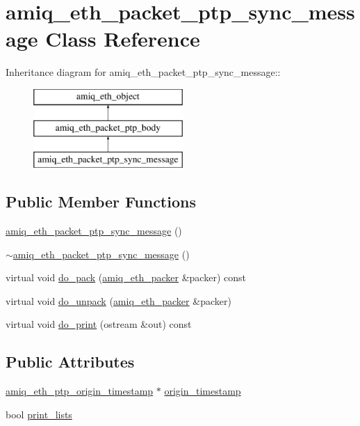 \hypertarget{classamiq__eth__packet__ptp__sync__message}{
\section{amiq\_\-eth\_\-packet\_\-ptp\_\-sync\_\-message Class Reference}
\label{classamiq__eth__packet__ptp__sync__message}
}
Inheritance diagram for amiq\_\-eth\_\-packet\_\-ptp\_\-sync\_\-message::\begin{figure}[H]
\begin{center}
\leavevmode
\includegraphics[height=3cm]{classamiq__eth__packet__ptp__sync__message}
\end{center}
\end{figure}
\subsection*{Public Member Functions}
\begin{DoxyCompactItemize}
\item 
\hyperlink{classamiq__eth__packet__ptp__sync__message_ad640a426a022d3a795d2ca5930faf864}{amiq\_\-eth\_\-packet\_\-ptp\_\-sync\_\-message} ()
\item 
\hyperlink{classamiq__eth__packet__ptp__sync__message_aa41c9c0ca4a366b0b16ead16d6777bb0}{$\sim$amiq\_\-eth\_\-packet\_\-ptp\_\-sync\_\-message} ()
\item 
virtual void \hyperlink{classamiq__eth__packet__ptp__sync__message_a5bb7abd15c0d2d2d733f042ad13c898d}{do\_\-pack} (\hyperlink{classamiq__eth__packer}{amiq\_\-eth\_\-packer} \&packer) const 
\item 
virtual void \hyperlink{classamiq__eth__packet__ptp__sync__message_ad0756fb94c7d9ea5ea0da34ca6b41a53}{do\_\-unpack} (\hyperlink{classamiq__eth__packer}{amiq\_\-eth\_\-packer} \&packer)
\item 
virtual void \hyperlink{classamiq__eth__packet__ptp__sync__message_a3eca4a1338800bcac5fdac104f350366}{do\_\-print} (ostream \&out) const 
\end{DoxyCompactItemize}
\subsection*{Public Attributes}
\begin{DoxyCompactItemize}
\item 
\hyperlink{amiq__eth__types_8cpp_add82721f4ff373d2b82269bbf5941032}{amiq\_\-eth\_\-ptp\_\-origin\_\-timestamp} $\ast$ \hyperlink{classamiq__eth__packet__ptp__sync__message_a33121ee506581632ab544ead48cbe342}{origin\_\-timestamp}
\item 
bool \hyperlink{classamiq__eth__packet__ptp__sync__message_ae7f8f44c6b98c23c6f826bbc29e7598c}{print\_\-lists}
\end{DoxyCompactItemize}


